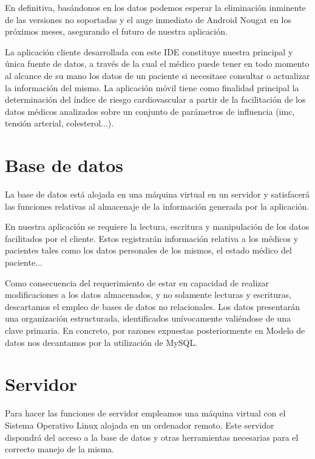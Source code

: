 \documentclass[11pt,spanish,
		listoftables,listoffigures]
		{tfgplantilla}
\begin{document}
En definitiva, basándonos en los datos podemos esperar la eliminación inminente de las versiones no soportadas y el auge inmediato de Android Nougat en los próximos meses, asegurando el futuro de nuestra aplicación.

La aplicación cliente desarrollada con este IDE constituye nuestra principal y única fuente de datos, a través de la cual el médico puede tener en todo momento al alcance de su mano los datos de un paciente si necesitase consultar o actualizar la información del mismo. La aplicación móvil tiene como finalidad principal la determinación del índice de riesgo cardiovascular a partir de la facilitación de los datos médicos analizados sobre un conjunto de parámetros de influencia (imc, tensión arterial, colesterol...).

\section {Base de datos}

La base de datos está alojada en una máquina virtual en un servidor y satisfacerá las funciones relativas al almacenaje de la información generada por la aplicación. 

En nuestra aplicación se requiere la lectura, escritura y manipulación de los datos facilitados por el cliente. Estos registrarán información relativa a los médicos y pacientes tales como los datos personales de los mismos, el estado médico del paciente...

Como consecuencia del requerimiento de estar en capacidad de realizar modificaciones a los datos almacenados, y no solamente lecturas y escrituras, descartamos el empleo de bases de datos no relacionales. Los datos presentarán una organización estructurada, identificados unívocamente valiéndose de una clave primaria. En concreto, por razones expuestas posteriormente en Modelo de datos nos decantamos por la utilización de MySQL.

\section {Servidor}

Para hacer las funciones de servidor empleamos una máquina virtual con el Sistema Operativo Linux alojada en un ordenador remoto. Este servidor dispondrá del acceso a la base de datos y otras herramientas necesarias para el correcto manejo de la misma.


\end{document}
